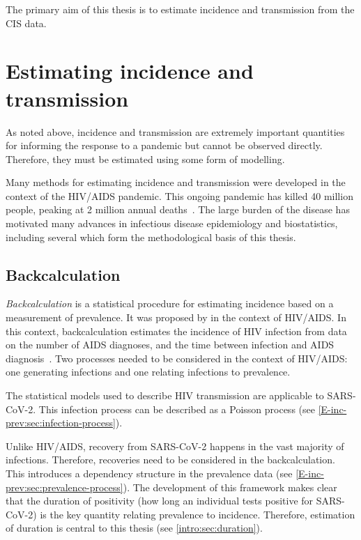 \documentclass[thesis.tex]{subfiles}
\begin{document}
The primary aim of this thesis is to estimate incidence and transmission from the CIS data.

\section{Estimating incidence and transmission} \label{intro:sec:estimating-incidence}

As noted above, incidence and transmission are extremely important quantities for informing the response to a pandemic but cannot be observed directly.
Therefore, they must be estimated using some form of modelling.

Many methods for estimating incidence and transmission were developed in the context of the HIV/AIDS pandemic.
This ongoing pandemic has killed 40 million people, peaking at 2 million annual deaths~\autocite{unaids2023}.
The large burden of the disease has motivated many advances in infectious disease epidemiology and biostatistics, including several which form the methodological basis of this thesis.

\subsection{Backcalculation}

\emph{Backcalculation} is a statistical procedure for estimating incidence based on a measurement of prevalence.
It was proposed by \textcite{brookmeyerMethod} in the context of HIV/AIDS.
In this context, backcalculation estimates the incidence of HIV infection from data on the number of AIDS diagnoses, and the time between infection and AIDS diagnosis~\autocite{brookmeyerBackcalculation,brookmeyerMeasuring}.
Two processes needed to be considered in the context of HIV/AIDS: one generating infections and one relating infections to prevalence.

The statistical models used to describe HIV transmission are applicable to SARS-CoV-2.
This infection process can be described as a Poisson process (see \cref{E-inc-prev:sec:infection-process}).

Unlike HIV/AIDS, recovery from SARS-CoV-2 happens in the vast majority of infections.
Therefore, recoveries need to be considered in the backcalculation.
This introduces a dependency structure in the prevalence data (see \cref{E-inc-prev:sec:prevalence-process}).
The development of this framework makes clear that the duration of positivity (how long an individual tests positive for SARS-CoV-2) is the key quantity relating prevalence to incidence.
Therefore, estimation of duration is central to this thesis (see \cref{intro:sec:duration}).
\end{document}
